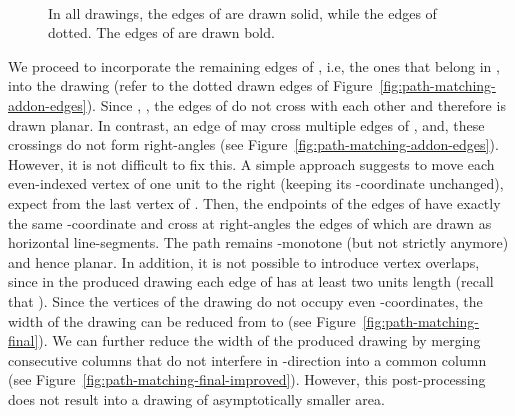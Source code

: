 \documentclass{llncs}
\begin{document}
\begin{figure}[t!]
  \begin{minipage}[b]{.67\textwidth}
     \raggedleft
  \end{minipage}
  \hfill
  \begin{minipage}[b]{.32\textwidth}
     ~
  \end{minipage}
  \vfill
  \begin{minipage}[b]{.67\textwidth}
     \raggedleft
  \end{minipage}
  \hfill
  \begin{minipage}[b]{.32\textwidth}
     \raggedright
  \end{minipage}
  \caption{In all drawings, the edges of  are drawn solid, while the edges of 
  dotted. The edges of  are drawn bold.}
  \label{fig:path-matching-final-drawing}
\end{figure}

We proceed to incorporate the remaining edges of , i.e,
the ones that belong in , into the
drawing (refer to the dotted drawn edges of
Figure~\ref{fig:path-matching-addon-edges}). Since ,
, the edges of  do not cross with each
other and therefore  is drawn planar. In contrast, an
edge of  may cross multiple edges of
, and, these crossings do not form right-angles (see
Figure~\ref{fig:path-matching-addon-edges}). However, it is not
difficult to fix this. A simple approach suggests to move each
even-indexed vertex of  one unit to the right (keeping
its -coordinate unchanged), expect from the last vertex of
. Then, the endpoints of the edges of
 have exactly the same -coordinate
and cross at right-angles the edges of  which are drawn
as horizontal line-segments. The path remains -monotone (but not
strictly anymore) and hence planar. In addition, it is not possible
to introduce vertex overlaps, since in the produced drawing each
edge of  has at least two units length (recall that
). Since the
vertices of the drawing do not occupy even -coordinates, the
width of the drawing can be reduced from  to  (see
Figure~\ref{fig:path-matching-final}). We can further reduce the
width of the produced drawing by merging consecutive columns that do
not interfere in -direction into a common column (see
Figure~\ref{fig:path-matching-final-improved}). However, this
post-processing does not result into a drawing of asymptotically
smaller area.
\end{document}

